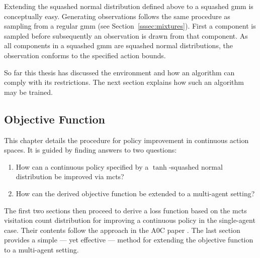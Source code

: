 Extending the squashed normal distribution defined above to a squashed \gls{gmm} is conceptually easy. Generating observations follows the same procedure as sampling from a regular \gls{gmm} (see Section~\ref{sssec:mixtures}). First a component is sampled before subsequently an observation is drawn from that component. As all components in a squashed \gls{gmm} are squashed normal distributions, the observation conforms to the specified action bounds.

So far this thesis has discussed the environment and how an algorithm can comply with its restrictions. The next section explains how such an algorithm may be trained.


\subsection{Objective Function}\label{ssec:objective_function}
This chapter details the procedure for policy improvement in continuous action spaces. It is guided by finding answers to two questions:
\begin{enumerate}
    \item How can a continuous policy specified by a $\tanh$-squashed normal distribution be improved via \gls{mcts}?
    \item How can the derived objective function be extended to a multi-agent setting?
\end{enumerate}
The first two sections then proceed to derive a loss function based on the \gls{mcts} visitation count distribution for improving a continuous policy in the single-agent case. Their contents follow the approach in the A0C paper \cite{moerlandA0CAlphaZero2018}. The last section provides a simple --- yet effective ---  method for extending the objective function to a multi-agent setting.

